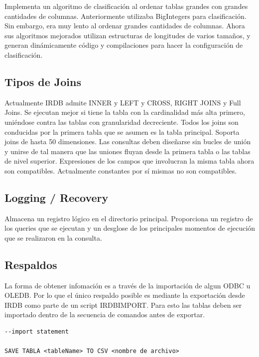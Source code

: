 \documentclass{acmart}
\begin{document}
Implementa un algoritmo de clasificación al ordenar tablas grandes con grandes cantidades de columnas. Anteriormente utilizaba BigIntegers para clasificación. Sin embargo, era muy lento al ordenar grandes cantidades de columnas. Ahora sus algoritmos mejorados utilizan estructuras de longitudes de varios tamaños, y generan dinámicamente código y compilaciones para hacer la configuración de clasificación.

\subsection{Tipos de Joins}

Actualmente IRDB admite INNER y LEFT y CROSS, RIGHT JOINS y Full Joins. Se ejecutan mejor si tiene la tabla con la cardinalidad más alta primero, uniéndose contra las tablas con granularidad decreciente. Todos los joins son conducidas por la primera tabla que se asumen es la tabla principal. Soporta joins de hasta 50 dimensiones. Las consultas deben diseñarse sin bucles de unión y unirse de tal manera que las uniones fluyan desde la primera tabla o las tablas de nivel superior. Expresiones de los campos que involucran la misma tabla ahora son compatibles. Actualmente constantes por sí mismas no son compatibles.

\subsection{Logging / Recovery}

Almacena un registro lógico en el directorio principal. Proporciona un registro de los queries que se ejecutan y un desglose de los principales momentos de ejecución que se realizaron en la consulta.

\subsection{Respaldos}

La forma de obtener infomación es a través de la importación de algun ODBC u OLEDB. Por lo que el único respaldo posible es mediante la exportación desde IRDB como parte de un script IRDBIMPORT. Para esto las tablas deben ser importado dentro de la secuencia de comandos antes de exportar.

\begin{verbatim}
--import statement

SAVE TABLA <tableName> TO CSV <nombre de archivo>
\end{verbatim}
\end{document}
